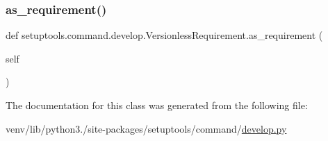 \subsubsection{\texorpdfstring{as\+\_\+requirement()}{as\_requirement()}}
{\footnotesize\ttfamily def setuptools.\+command.\+develop.\+Versionless\+Requirement.\+as\+\_\+requirement (\begin{DoxyParamCaption}\item[{}]{self }\end{DoxyParamCaption})}



The documentation for this class was generated from the following file\+:\begin{DoxyCompactItemize}
\item 
venv/lib/python3./site-\/packages/setuptools/command/\hyperlink{setuptools_2command_2develop_8py}{develop.\+py}\end{DoxyCompactItemize}
